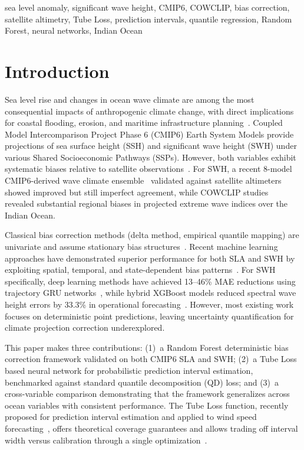 \documentclass[conference]{IEEEtran}
\begin{document}
\begin{IEEEkeywords}
sea level anomaly, significant wave height, CMIP6, COWCLIP, bias correction, satellite altimetry, Tube Loss, prediction intervals, quantile regression, Random Forest, neural networks, Indian Ocean
\end{IEEEkeywords}

\section{Introduction}

Sea level rise and changes in ocean wave climate are among the most consequential impacts of anthropogenic climate change, with direct implications for coastal flooding, erosion, and maritime infrastructure planning~\cite{church2013}. Coupled Model Intercomparison Project Phase 6 (CMIP6) Earth System Models provide projections of sea surface height (SSH) and significant wave height (SWH) under various Shared Socioeconomic Pathways (SSPs). However, both variables exhibit systematic biases relative to satellite observations~\cite{lemos2020}. For SWH, a recent 8-model CMIP6-derived wave climate ensemble~\cite{morim2024} validated against satellite altimeters showed improved but still imperfect agreement, while COWCLIP studies~\cite{cowclip2023} revealed substantial regional biases in projected extreme wave indices over the Indian Ocean.

Classical bias correction methods (delta method, empirical quantile mapping) are univariate and assume stationary bias structures~\cite{cannon2018}. Recent machine learning approaches have demonstrated superior performance for both SLA and SWH by exploiting spatial, temporal, and state-dependent bias patterns~\cite{reichstein2019}. For SWH specifically, deep learning methods have achieved 13--46\% MAE reductions using trajectory GRU networks~\cite{wang2024swh}, while hybrid XGBoost models reduced spectral wave height errors by 33.3\% in operational forecasting~\cite{vanvledder2023}. However, most existing work focuses on deterministic point predictions, leaving uncertainty quantification for climate projection correction underexplored.

This paper makes three contributions: (1)~a Random Forest deterministic bias correction framework validated on both CMIP6 SLA and SWH; (2)~a Tube Loss~\cite{anand2024} based neural network for probabilistic prediction interval estimation, benchmarked against standard quantile decomposition (QD) loss; and (3)~a cross-variable comparison demonstrating that the framework generalizes across ocean variables with consistent performance. The Tube Loss function, recently proposed for prediction interval estimation and applied to wind speed forecasting~\cite{anand2024tube_wind}, offers theoretical coverage guarantees and allows trading off interval width versus calibration through a single optimization~\cite{anand2024}.
\end{document}

